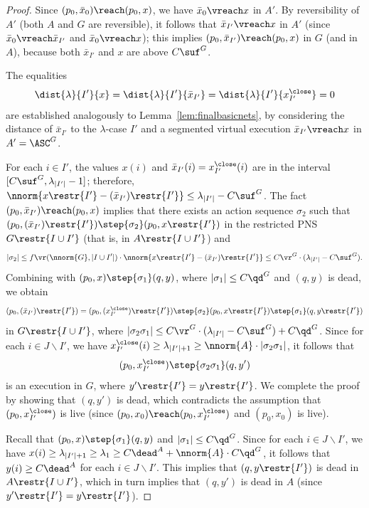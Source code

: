 \begin{proof}
	Since $(p_0,\bar{x}_0)\reach (p_0,x)$, we have
	$\bar{x}_0\vreach x$ in $A'$. By reversibility of $A'$
	(both $A$ and $G$ are reversible), it follows that
	$\bar{x}_{I'}\vreach x$ in $A'$ (since $\bar{x}_0\vreach
	\bar{x}_{I'}$ and $\bar{x}_0\vreach x$); this implies
	$(p_0,\bar{x}_{I'})\reach (p_0,x)$ in $G$ (and in $A$), because
	both $\bar{x}_{I'}$ and $x$ are above $C\suf^G$.

The equalities 
\[\dist{\lambda}{I'}{x}=\dist{\lambda}{I'}{\bar{x}_{I'}}=\dist{\lambda}{I'}{x^\close_{I'}}=0\] 
are established analogously to Lemma~\ref{lem:finalbasicnets},
by considering the distance of $\bar{x}_{I'}$ to the $\lambda$-case $I'$
	and a segmented virtual execution $\bar{x}_{I'}\vreach x$ in
	$A'=\ASC^G$.

For each $i\in I'$, the values $x(i)$ and
$\bar{x}_{I'}(i)=x^\close_{I'}(i)$ are in the interval
$[C\suf^G,\lambda_{|I'|}-1]$; therefore, 
$\nnorm{x\restr{I'}-(\bar{x}_{I'})\restr{I'}}\leq \lambda_{|I'|}-C\suf^G$.
The fact 
$(p_0,\bar{x}_{I'})\reach (p_0,x)$ implies that
there exists an action sequence $\sigma_2$ such that 
$(p_0,(\bar{x}_{I'})\restr{I'})\step{\sigma_2} (p_0,x\restr{I'})$ in
the restricted PNS $G\restr{I\cup I'}$ (that is, in $A\restr{I\cup I'}$)
and
\[|\sigma_2|\leq f\vr(\nnorm{G},|I\cup I'|)\cdot
\nnorm{x\restr{I'}-(\bar{x}_{I'})\restr{I'}}\leq C\vr^{G}\cdot
(\lambda_{|I'|}-C\suf^G).\]
Combining with $(p_0,x)\step{\sigma_1}(q,y)$, where $|\sigma_1|\leq
C\qd^G$ and $(q,y)$ is dead, we obtain
\[(p_0,(\bar{x}_{I'})\restr{I'})=(p_0,(x^\close_{I'})\restr{I'})\step{\sigma_2}
(p_0,x\restr{I'})\step{\sigma_1}(q,y\restr{I'})\]
in $G\restr{I\cup I'}$, where $|\sigma_2\sigma_1|\leq C\vr^{G}\cdot
(\lambda_{|I'|}-C\suf^G)+C\qd^G$.
Since for each $i\in J\smallsetminus I'$, we have
$x^\close_{I'}(i)\geq\lambda_{|I'|+1}\geq \nnorm{A}\cdot
|\sigma_2\sigma_1|$, it follows that 
\[(p_0,x^\close_{I'})\step{\sigma_2\sigma_1}(q,y')\]
is an execution in $G$, where $y'\restr{I'}=y\restr{I'}$.
We complete the proof by showing that $(q,y')$ is dead, which
contradicts the assumption that $(p_0,x^\close_{I'})$ is live (since 
$(p_0,x_0)\reach(p_0,x^\close_{I'})$ and $(p_0,x_0)$ is live).

Recall that $(p_0,x)\step{\sigma_1}(q,y)$ and $|\sigma_1|\leq C\qd^G$.
Since for each $i\in J\smallsetminus I'$, we have $x(i)\geq
\lambda_{|I'|+1}\geq \lambda_1\geq C\dead^A+ \nnorm{A}\cdot C\qd^G$, it follows that 
$y(i)\geq C\dead^A$ for each  $i\in J\smallsetminus I'$. This implies
that $(q,y\restr{I'})$ is dead in $A\restr{I\cup I'}$, which in turn
implies that $(q,y')$ is dead in $A$ (since
$y'\restr{I'}=y\restr{I'}$).
\end{proof}


